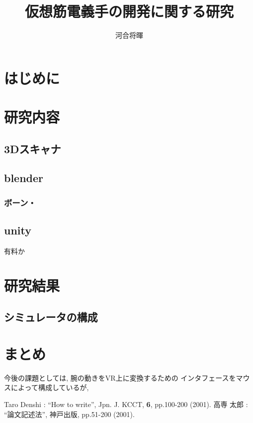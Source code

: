 \documentclass[11pt]{ltjsarticle}
\title{仮想筋電義手の開発に関する研究}
\author{河合将暉}
\begin{document}
\maketitle

\section{はじめに}
	
	\section{研究内容}
		\subsection{3Dスキャナ}
		\subsection{blender}
		\subsubsection{ボーン・}
		\subsection{unity}
		有料か

\section{研究結果}
	\subsection{シミュレータの構成}
\section{まとめ}
	今後の課題としては, 腕の動きをVR上に変換するための
	インタフェースをマウスによって構成しているが,

\begin{thebibliography}{99}%
	Taro Denshi : ``How to write'', Jpn. J. KCCT,
	\textbf{6}, pp.100-200 (2001).
	高専 太郎 : ``論文記述法'', 神戸出版, pp.51-200 (2001).
\end{thebibliography}
\end{document}
